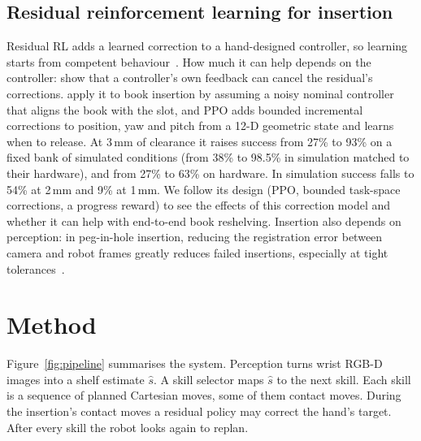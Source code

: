 \documentclass{article}
\begin{document}
\subsection{Residual reinforcement learning for insertion}
Residual RL adds a learned correction to a hand-designed controller, so learning starts from competent behaviour~\citep{johannink2019residual,
silver2018residual}. How much it can help depends on the controller: \citet{ranjbar2021residual} show that a
controller's own feedback can cancel the residual's corrections. \citet{liu2026residual} apply it to book insertion by assuming a noisy nominal controller that aligns the book with the slot, and PPO adds bounded incremental corrections to position, yaw and pitch from a 12-D geometric state and learns when to release. At 3\,mm of clearance it raises success from 27\% to 93\% on a fixed bank of simulated conditions (from 38\% to 98.5\% in simulation matched to their hardware), and from 27\% to 63\% on hardware. In simulation success falls to 54\% at 2\,mm and 9\% at 1\,mm. We follow its design (PPO, bounded task-space corrections, a progress reward) to see the effects of this correction model and whether it can help with end-to-end book reshelving.
Insertion also depends on perception: in peg-in-hole insertion, reducing the registration error between
camera and robot frames greatly reduces failed insertions, especially at tight
tolerances~\citep{cheok2021registration}.


\section{Method}

Figure~\ref{fig:pipeline} summarises the system. Perception turns wrist RGB-D images into a shelf estimate
$\hat{s}$. A skill selector maps $\hat{s}$ to the next skill. Each skill is a
sequence of planned Cartesian moves, some of them contact moves. During the insertion's contact moves a
residual policy may correct the hand's target. After every skill the robot looks again to replan.
\end{document}

